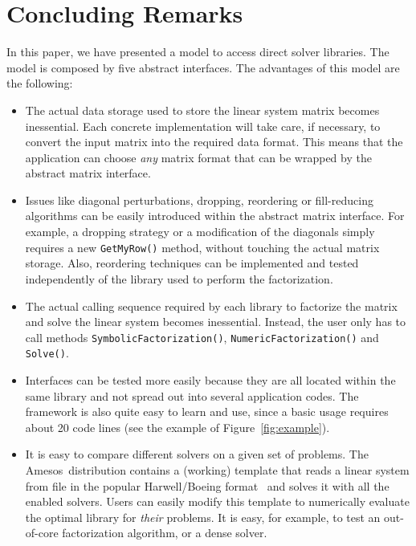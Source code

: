 \documentclass[acmtocl]{acmtrans2m}
\newcommand{\amesos}{{\sc Amesos}}
\begin{document}
\section{Concluding Remarks}
\label{sec:conclusions}

In this paper, we have presented a model to access direct
solver libraries. The model is composed by five abstract interfaces.
The advantages of this model are the following:
\begin{itemize}

\item The actual data storage used to store the linear system matrix becomes inessential.
Each concrete implementation will take care, if necessary, to convert the
input matrix into the required data format. This means that the
application can choose {\sl any} matrix format that can be wrapped by the
abstract matrix interface.

\item Issues like diagonal perturbations, dropping, reordering or
fill-reducing algorithms 
can be easily introduced within the abstract matrix interface.
For example, a dropping strategy or a modification of the diagonals simply
requires a new \verb!GetMyRow()! method, without touching the actual matrix
storage. Also, reordering techniques can be implemented and tested
independently of the library used to perform the factorization.

\item The actual calling sequence required by each library to factorize the
matrix and solve the linear system becomes inessential. Instead, the user only
has to call methods \verb!SymbolicFactorization()!, \verb!NumericFactorization()! and
\verb!Solve()!.

\item Interfaces can be tested more easily because they are all located within
the same library and not spread out into several application codes. The
framework is also quite easy to learn and use, since a basic usage 
requires about 20 code lines (see the example of Figure~\ref{fig:example}).

\item It is easy to compare different solvers on a given set of problems. The
\amesos\ distribution contains a (working) template that reads a linear system
from file in the popular Harwell/Boeing format~\cite{duff89sparse} and solves it with all the
enabled solvers. Users can easily modify this template to numerically evaluate
the optimal library for {\sl their} problems.
It is easy, for example, to test an out-of-core factorization algorithm, or a
dense solver.


\end{itemize}
\end{document}
